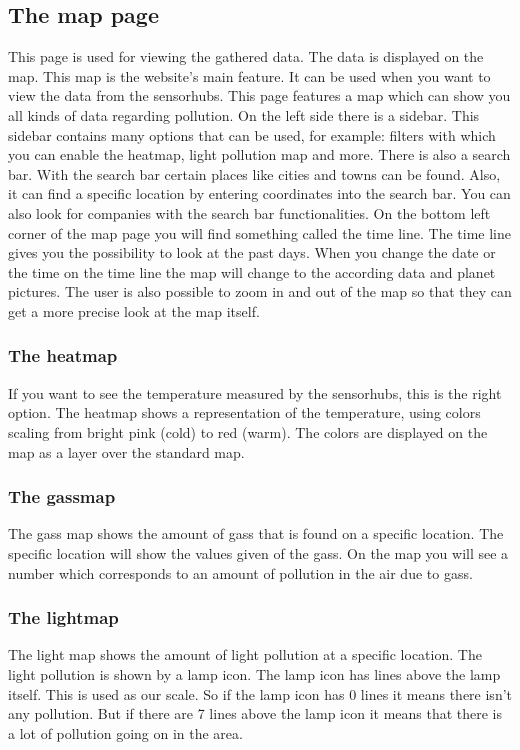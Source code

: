 \documentclass[a4paper]{article}
\begin{document}
\subsection{The map page}
This page is used for viewing the gathered data. The data is displayed on the map. This map is the website's main feature. It can be used when you want to view the data from the sensorhubs.
\newline
This page features a map which can show you all kinds of data regarding pollution. On the left side there is a sidebar. This sidebar contains many options that can be used, for example: filters with which you can enable the heatmap, light pollution map and more.
\newline
There is also a search bar. With the search bar certain places like cities and towns can be found. Also, it can find a specific location by entering coordinates into the search bar. You can also look for companies with the search bar functionalities.
\newline
On the bottom left corner of the map page you will find something called the time line. The time line gives you the possibility to look at the past days. When you change the date or the time on the time line the map will change to the according data and planet pictures.  
\newline
The user is also possible to zoom in and out of the map so that they can get a more precise look at the map itself. 
\newline

\subsubsection{The heatmap}
If you want to see the temperature measured by the sensorhubs, this is the right option.
The heatmap shows a representation of the temperature, using colors scaling from bright pink (cold) to red (warm). The colors are displayed on the map as a layer over the standard map.
\newline
\subsubsection{The gassmap} 
The gass map shows the amount of gass that is found on a specific location. The specific location will show the values given of the gass. On the map you will see a number which corresponds to an amount of pollution in the air due to gass.  

\subsubsection{The lightmap}
The light map shows the amount of light pollution at a specific location. The light pollution is shown by a lamp icon. The lamp icon has lines above the lamp itself. This is used as our scale. So if the lamp icon has 0 lines it means there isn't any pollution. But if there are 7 lines above the lamp icon it means that there is a lot of pollution going on in the area.
\end{document}
